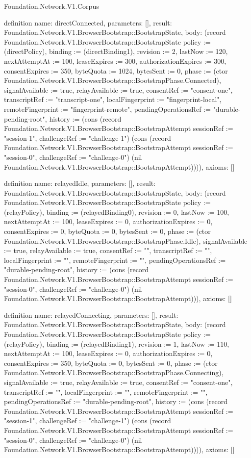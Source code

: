 \begin{lexlean}{Foundation.Network.V1.Corpus}
\begin{semanticmodule}
definition{
  name: directConnected,
  parameters: [],
  result: Foundation.Network.V1.BrowserBootstrap::BootstrapState,
  body: (record Foundation.Network.V1.BrowserBootstrap::BootstrapState {policy := (directPolicy), binding := (directBinding1), revision := 2, lastNow := 120, nextAttemptAt := 100, leaseExpires := 300, authorizationExpires := 300, consentExpires := 350, byteQuota := 1024, bytesSent := 0, phase := (ctor Foundation.Network.V1.BrowserBootstrap::BootstrapPhase.Connected), signalAvailable := true, relayAvailable := true, consentRef := "consent-one", transcriptRef := "transcript-one", localFingerprint := "fingerprint-local", remoteFingerprint := "fingerprint-remote", pendingOperationsRef := "durable-pending-root", history := (cons (record Foundation.Network.V1.BrowserBootstrap::BootstrapAttempt {sessionRef := "session-1", challengeRef := "challenge-1"}) (cons (record Foundation.Network.V1.BrowserBootstrap::BootstrapAttempt {sessionRef := "session-0", challengeRef := "challenge-0"}) (nil Foundation.Network.V1.BrowserBootstrap::BootstrapAttempt)))}),
  axioms: []
}

definition{
  name: relayedIdle,
  parameters: [],
  result: Foundation.Network.V1.BrowserBootstrap::BootstrapState,
  body: (record Foundation.Network.V1.BrowserBootstrap::BootstrapState {policy := (relayPolicy), binding := (relayedBinding0), revision := 0, lastNow := 100, nextAttemptAt := 100, leaseExpires := 0, authorizationExpires := 0, consentExpires := 0, byteQuota := 0, bytesSent := 0, phase := (ctor Foundation.Network.V1.BrowserBootstrap::BootstrapPhase.Idle), signalAvailable := true, relayAvailable := true, consentRef := "", transcriptRef := "", localFingerprint := "", remoteFingerprint := "", pendingOperationsRef := "durable-pending-root", history := (cons (record Foundation.Network.V1.BrowserBootstrap::BootstrapAttempt {sessionRef := "session-0", challengeRef := "challenge-0"}) (nil Foundation.Network.V1.BrowserBootstrap::BootstrapAttempt))}),
  axioms: []
}

definition{
  name: relayedConnecting,
  parameters: [],
  result: Foundation.Network.V1.BrowserBootstrap::BootstrapState,
  body: (record Foundation.Network.V1.BrowserBootstrap::BootstrapState {policy := (relayPolicy), binding := (relayedBinding1), revision := 1, lastNow := 110, nextAttemptAt := 100, leaseExpires := 0, authorizationExpires := 0, consentExpires := 350, byteQuota := 0, bytesSent := 0, phase := (ctor Foundation.Network.V1.BrowserBootstrap::BootstrapPhase.Connecting), signalAvailable := true, relayAvailable := true, consentRef := "consent-one", transcriptRef := "", localFingerprint := "", remoteFingerprint := "", pendingOperationsRef := "durable-pending-root", history := (cons (record Foundation.Network.V1.BrowserBootstrap::BootstrapAttempt {sessionRef := "session-1", challengeRef := "challenge-1"}) (cons (record Foundation.Network.V1.BrowserBootstrap::BootstrapAttempt {sessionRef := "session-0", challengeRef := "challenge-0"}) (nil Foundation.Network.V1.BrowserBootstrap::BootstrapAttempt)))}),
  axioms: []
}


\end{semanticmodule}
\end{lexlean}
